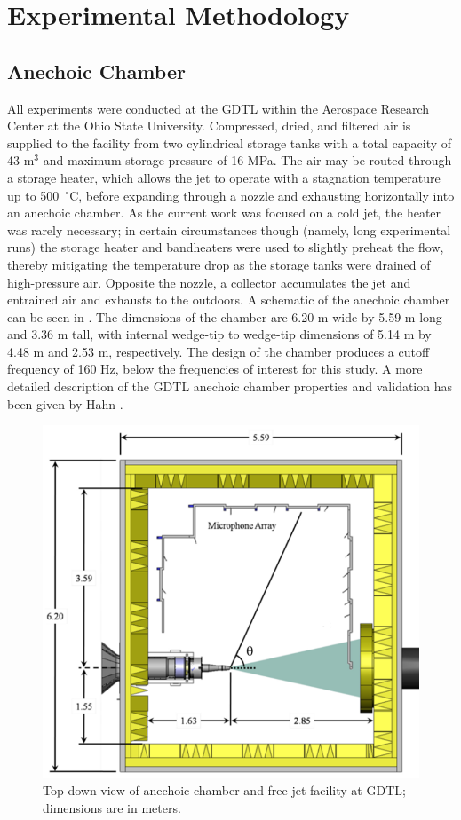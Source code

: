 \chapter{Experimental Methodology}
\label{methodology}

\section{Anechoic Chamber}
All experiments were conducted at the GDTL within the Aerospace Research Center at the Ohio State University. 
Compressed, dried, and filtered air is supplied to the facility from two cylindrical storage tanks with a total capacity of 43 m$^{3}$ and maximum storage pressure of 16 MPa.
The air may be routed through a storage heater, which allows the jet to operate with a stagnation temperature up to 500~$^\circ$C, before expanding through a nozzle and exhausting horizontally into an anechoic chamber. 
As the current work was focused on a cold jet, the heater was rarely necessary; in certain circumstances though (namely, long experimental runs) the storage heater and bandheaters were used to slightly preheat the flow, thereby mitigating the temperature drop as the storage tanks were drained of high-pressure air.
Opposite the nozzle, a collector accumulates the jet and entrained air and exhausts to the outdoors. 
A schematic of the anechoic chamber can be seen in . 
The dimensions of the chamber are 6.20 m wide by 5.59 m long and 3.36 m tall, with internal wedge-tip to wedge-tip dimensions of 5.14 m by 4.48 m and 2.53 m, respectively. 
The design of the chamber produces a cutoff frequency of 160 Hz, below the frequencies of interest for this study. 
A more detailed description of the GDTL anechoic chamber properties and validation has been given by Hahn \citep{Hahn2011}.
\begin{figure}
	\centering
	\includegraphics{Figures/Chamber_Schematic.png}
	\caption{Top-down view of anechoic chamber and free jet facility at GDTL; dimensions are in meters.} 
	\label{fig:chamber}
\end{figure}

